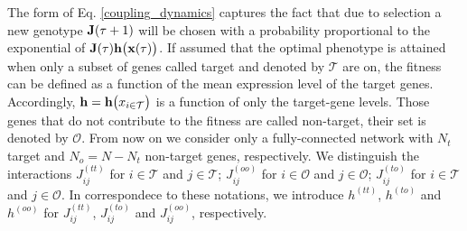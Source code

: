 \documentclass[%
 reprint,
superscriptaddress,
 amsmath,amssymb,
 prl,
]{revtex4-2}
\begin{document}
The form of Eq. \eqref{coupling_dynamics}  captures the  fact that due to selection  a new genotype $\bold{J}(\tau+1)$ will be chosen with a probability proportional to the exponential  of %
$\bold{J}(\tau)\bold{h}\big(\mathbf{x}(\tau)\big)$.  %
If assumed that the optimal phenotype is attained when only a subset of genes called target and denoted by $\mathcal{T}$ are on, the  fitness  can be defined as
 a function of the mean expression level of the target genes. Accordingly, $\bold{h} = \bold{h}\big({x}_{i \in \mathcal{T}}\big)$ is a function of only the target-gene levels. Those genes that do not contribute to the fitness are called non-target, their set is denoted by $\mathcal{O}$. From now on we  consider only a fully-connected network with $N_t$ target    and $N_o = N- N_t$  non-target genes, respectively. We distinguish the interactions   $J_{ij}^{(tt)}$ for $i \in \mathcal{T}$ and $j \in \mathcal{T}$;   $J_{ij}^{(oo)}$ for $i  \in \mathcal{O}$ and  $j \in \mathcal{O}$;  $J_{ij}^{(to)}$ for $i \in \mathcal{T}$ and $j \in \mathcal{O}$.  In correspondece to these notations, we introduce $h^{(tt)}$,  $h^{(to)}$ and $h^{(oo)}$ for $J_{ij}^{(tt)}$,  $J_{ij}^{(to)}$ and $J_{ij}^{(oo)}$, respectively.
\end{document}
